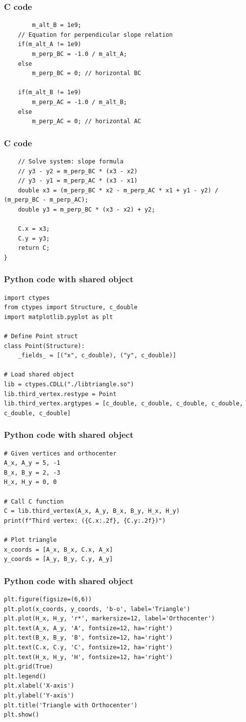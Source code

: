 \documentclass{beamer}
\begin{document}
\begin{frame}[fragile]
\frametitle{C code}
\begin{lstlisting}
        m_alt_B = 1e9;
    // Equation for perpendicular slope relation
    if(m_alt_A != 1e9)
        m_perp_BC = -1.0 / m_alt_A;
    else
        m_perp_BC = 0; // horizontal BC

    if(m_alt_B != 1e9)
        m_perp_AC = -1.0 / m_alt_B;
    else
        m_perp_AC = 0; // horizontal AC
\end{lstlisting}
\end{frame}
\begin{frame}[fragile]
\frametitle{C code}
\begin{lstlisting}
    // Solve system: slope formula
    // y3 - y2 = m_perp_BC * (x3 - x2)
    // y3 - y1 = m_perp_AC * (x3 - x1)
    double x3 = (m_perp_BC * x2 - m_perp_AC * x1 + y1 - y2) / (m_perp_BC - m_perp_AC);
    double y3 = m_perp_BC * (x3 - x2) + y2;

    C.x = x3;
    C.y = y3;
    return C;
}
\end{lstlisting}
\end{frame}
\begin{frame}[fragile]
\frametitle{Python code with shared object}
\begin{lstlisting}
import ctypes
from ctypes import Structure, c_double
import matplotlib.pyplot as plt

# Define Point struct
class Point(Structure):
    _fields_ = [("x", c_double), ("y", c_double)]

# Load shared object
lib = ctypes.CDLL("./libtriangle.so")
lib.third_vertex.restype = Point
lib.third_vertex.argtypes = [c_double, c_double, c_double, c_double, c_double, c_double]
\end{lstlisting}
\end{frame}
\begin{frame}[fragile]
\frametitle{Python code with shared object}
\begin{lstlisting}
# Given vertices and orthocenter
A_x, A_y = 5, -1
B_x, B_y = 2, -3
H_x, H_y = 0, 0

# Call C function
C = lib.third_vertex(A_x, A_y, B_x, B_y, H_x, H_y)
print(f"Third vertex: ({C.x:.2f}, {C.y:.2f})")

# Plot triangle
x_coords = [A_x, B_x, C.x, A_x]
y_coords = [A_y, B_y, C.y, A_y]
\end{lstlisting}
\end{frame}
\begin{frame}[fragile]
\frametitle{Python code with shared object}
\begin{lstlisting}
plt.figure(figsize=(6,6))
plt.plot(x_coords, y_coords, 'b-o', label='Triangle')
plt.plot(H_x, H_y, 'r*', markersize=12, label='Orthocenter')
plt.text(A_x, A_y, 'A', fontsize=12, ha='right')
plt.text(B_x, B_y, 'B', fontsize=12, ha='right')
plt.text(C.x, C.y, 'C', fontsize=12, ha='right')
plt.text(H_x, H_y, 'H', fontsize=12, ha='right')
plt.grid(True)
plt.legend()
plt.xlabel('X-axis')
plt.ylabel('Y-axis')
plt.title('Triangle with Orthocenter')
plt.show()
\end{lstlisting}
\end{frame}
\end{document}
